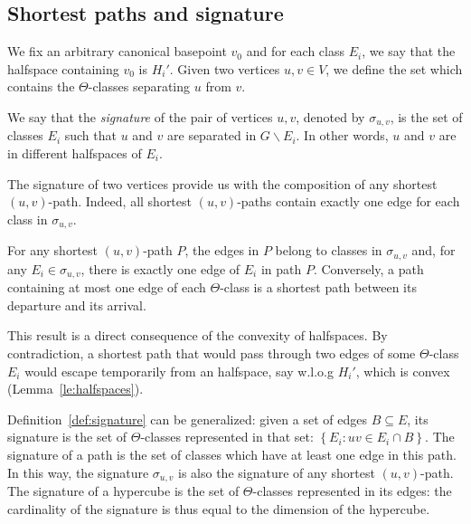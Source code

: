 \documentclass[a4paper,UKenglish,numberwithinsect,cleveref, autoref]{lipics-v2021}
\newcommand{\set}[1]{\left\{ #1 \right\}}
\begin{document}
\subsection{Shortest paths and signature} \label{asubsec:signature}

We fix an arbitrary canonical basepoint $v_0$ and for each class $E_i$, we say that the halfspace containing $v_0$ is $H_i'$.
Given two vertices $u,v \in V$, we define the set which contains the $\Theta$-classes separating $u$ from $v$.

\begin{definition}
We say that the {\em signature} of the pair of vertices $u,v$, denoted by $\sigma_{u,v}$, is the set of classes $E_i$ such that $u$ and $v$ are separated in $G\backslash E_i$. In other words, $u$ and $v$ are in different halfspaces of $E_i$.
\label{def:signature}
\end{definition}

The signature of two vertices provide us with the composition of any shortest $(u,v)$-path. Indeed, all shortest $(u,v)$-paths contain exactly one edge for each class in $\sigma_{u,v}$.

\begin{lemma}
For any shortest $(u,v)$-path $P$, the edges in $P$ belong to classes in $\sigma_{u,v}$ and, for any $E_i \in \sigma_{u,v}$, there is exactly one edge of $E_i$ in path $P$. Conversely, a path containing at most one edge of each $\Theta$-class is a shortest path between its departure and its arrival.
\label{le:signature}
\end{lemma}

This result is a direct consequence of the convexity of halfspaces. By contradiction, a shortest path that would pass through two edges of some $\Theta$-class $E_i$ would escape temporarily from an halfspace, say w.l.o.g $H_i'$,  which is convex (Lemma~\ref{le:halfspaces}).

Definition~\ref{def:signature} can be generalized: given a set of edges $B\subseteq E$, its signature is the set of $\Theta$-classes represented in that set: $\set{E_i : uv \in E_i \cap B}$. The signature of a path is the set of classes which have at least one edge in this path. In this way, the signature $\sigma_{u,v}$ is also the signature of any shortest $(u,v)$-path. The signature of a hypercube is the set of $\Theta$-classes represented in its edges: the cardinality of the signature is thus equal to the dimension of the hypercube.
\end{document}
